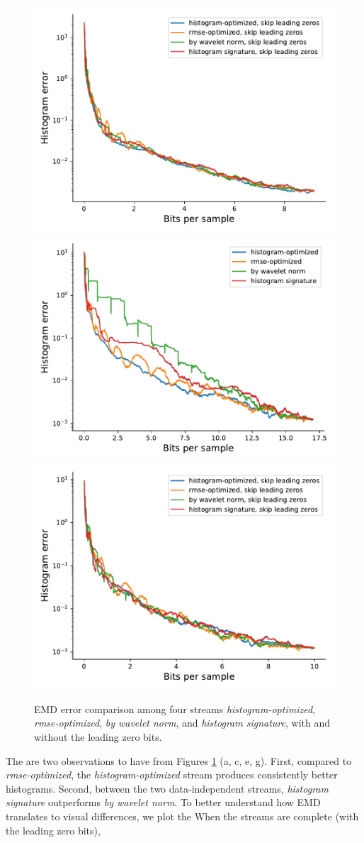 \begin{figure}
	{\includegraphics[width=0.48\linewidth]{img/histogram/skip-leading-zeros/miranda-diffusivity-histogram.pdf}}
	{\includegraphics[width=0.48\linewidth]{img/histogram/turbulence-histogram.pdf}}
	{\includegraphics[width=0.48\linewidth]{img/histogram/skip-leading-zeros/turbulence-histogram.pdf}}
	\caption{EMD error comparison among four streams \emph{histogram-optimized},
	\emph{rmse-optimized}, \emph{by wavelet norm}, and \emph{histogram signature}, with and without the leading zero bits.}
	\label{fig:histogram-stream-comparison}
\end{figure}

The are two observations to have from Figures \ref{fig:histogram-stream-comparison} (a, c, e, g).
First, compared to \emph{rmse-optimized}, the \emph{histogram-optimized} stream produces
consistently better histograms. Second, between the two data-independent streams, \emph{histogram
signature} outperforms \emph{by wavelet norm}. To better understand how EMD translates to visual differences, we plot the  When the streams are complete (with the leading zero
bits), 

